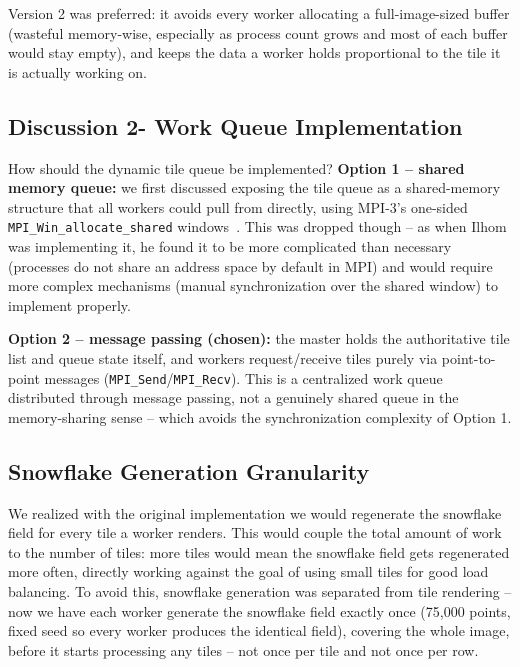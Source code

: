Version 2 was preferred: it avoids every worker allocating a full-image-sized buffer (wasteful memory-wise, especially as process count grows and most of each buffer would stay empty), and keeps the data a worker holds proportional to the tile it is actually working on.

\subsection{Discussion 2- Work Queue Implementation}

How should the dynamic tile queue be implemented? \textbf{Option 1 -- shared memory queue:} we first discussed exposing the tile queue as a shared-memory structure that all workers could pull from directly, using MPI-3's one-sided \texttt{MPI\_Win\_allocate\_shared} windows~\cite{mpi31_standard}. This was dropped though -- as when Ilhom was implementing it, he found it to be more complicated than necessary (processes do not share an address space by default in MPI) and would require more complex mechanisms (manual synchronization over the shared window) to implement properly.

\textbf{Option 2 -- message passing (chosen):} the master holds the authoritative tile list and queue state itself, and workers request/receive tiles purely via point-to-point messages (\texttt{MPI\_Send}/\texttt{MPI\_Recv}). This is a centralized work queue distributed through message passing, not a genuinely shared queue in the memory-sharing sense -- which avoids the synchronization complexity of Option 1.

\subsection{Snowflake Generation Granularity}

We realized with the original implementation we would regenerate the snowflake field for every tile a worker renders. This would couple the total amount of work to the number of tiles: more tiles would mean the snowflake field gets regenerated more often, directly working against the goal of using small tiles for good load balancing. To avoid this, snowflake generation was separated from tile rendering -- now we have each worker generate the snowflake field exactly once (75{,}000 points, fixed seed so every worker produces the identical field), covering the whole image, before it starts processing any tiles -- not once per tile and not once per row.
